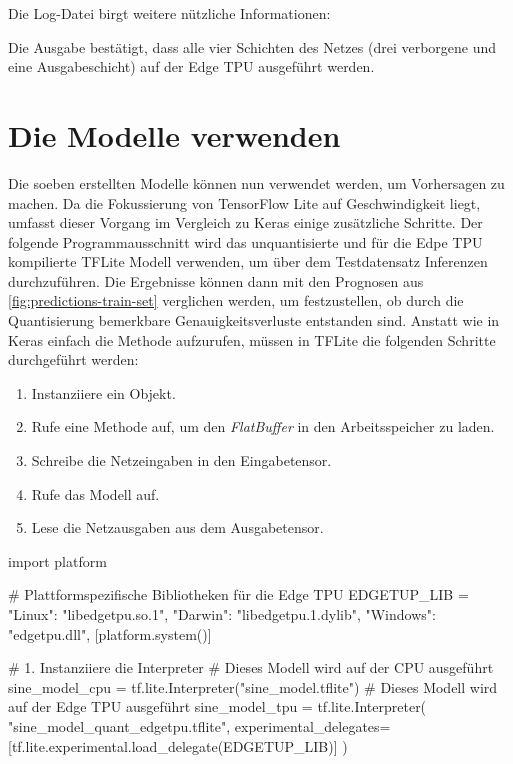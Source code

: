 Die Log-Datei birgt weitere nützliche Informationen:
Die Ausgabe bestätigt, dass alle vier Schichten des Netzes
(drei verborgene und eine Ausgabeschicht)
auf der Edge TPU ausgeführt werden.

\section{Die Modelle verwenden}
Die soeben erstellten Modelle können nun verwendet werden, um
Vorhersagen zu machen.
Da die Fokussierung von TensorFlow Lite auf Geschwindigkeit
liegt, umfasst dieser Vorgang im Vergleich zu Keras einige
zusätzliche Schritte. Der folgende Programmausschnitt
wird das unquantisierte und für die Edpe TPU
kompilierte TFLite Modell verwenden, um über dem Testdatensatz Inferenzen
durchzuführen. Die Ergebnisse können dann mit den Prognosen
aus \autoref{fig:predictions-train-set} verglichen werden,
um festzustellen, ob durch die Quantisierung bemerkbare
Genauigkeitsverluste entstanden sind.
Anstatt wie in Keras einfach die 
Methode aufzurufen, müssen in TFLite die folgenden
Schritte durchgeführt werden:
\begin{enumerate}
  \item Instanziiere ein  Objekt.
  \item Rufe eine Methode auf, um den
        \textit{FlatBuffer} in den Arbeitsspeicher zu laden.
  \item Schreibe die Netzeingaben in den Eingabetensor.
  \item Rufe das Modell auf.
  \item Lese die Netzausgaben aus dem Ausgabetensor.
\end{enumerate}
\begin{pythoncode}
import platform

# Plattformspezifische Bibliotheken für die Edge TPU
EDGETUP_LIB = {
    "Linux": "libedgetpu.so.1",
    "Darwin": "libedgetpu.1.dylib",
    "Windows": "edgetpu.dll",
}[platform.system()]

# 1. Instanziiere die Interpreter
# Dieses Modell wird auf der CPU ausgeführt
sine_model_cpu = tf.lite.Interpreter("sine_model.tflite")
# Dieses Modell wird auf der Edge TPU ausgeführt
sine_model_tpu = tf.lite.Interpreter(
    "sine_model_quant_edgetpu.tflite",
    experimental_delegates=[tf.lite.experimental.load_delegate(EDGETUP_LIB)]
)
\end{pythoncode}
